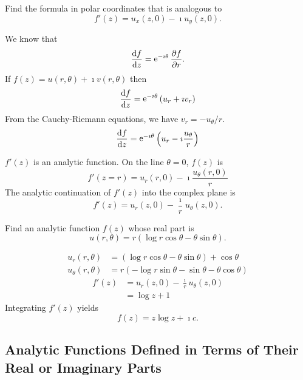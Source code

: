 \begin{Example}
  Find the formula in polar coordinates that is analogous to
  \[
  f'(z) = u_x(z, 0) - \imath u_y(z,0).
  \]

  We know that
  \[
  \frac{\mathrm{d} f}{\mathrm{d} z} = \mathop{\mathrm{e}}\nolimits^{-\imath \theta} \frac{\partial f}{\partial r}.
  \]
  If $f(z) = u(r,\theta) + \imath v(r,\theta)$ then
  \[
  \frac{\mathrm{d} f}{\mathrm{d} z} = \mathop{\mathrm{e}}\nolimits^{-\imath \theta} \left( u_r + \imath v_r \right)
  \]
  From the Cauchy-Riemann equations, we have $v_r = -u_\theta / r$.
  \[
  \frac{\mathrm{d} f}{\mathrm{d} z} = \mathop{\mathrm{e}}\nolimits^{-\imath \theta} \left( u_r - \imath \frac{ u_\theta}{r} \right)
  \]

  $f'(z)$ is an analytic function.  On the line $\theta = 0$, $f(z)$ is
  \[
  f'(z = r) = u_r(r,0) - \imath \frac{u_\theta(r,0)}{r}
  \]
  The analytic continuation of $f'(z)$ into the complex plane is
  \[
  \boxed{ 
    f'(z) = u_r(z, 0) - \frac{\imath}{r} u_\theta(z,0). 
    }
  \]
\end{Example}





\begin{Example}
  Find an analytic function $f(z)$ whose real part is
  \[
  u(r,\theta) =  r \left( \log r \cos \theta - \theta \sin \theta \right).
  \]

  \begin{align*}
    u_r(r, \theta) &= \left( \log r \cos \theta - \theta \sin \theta \right) + \cos \theta 
    \\
    u_\theta(r,\theta) &= r \left( -\log r \sin \theta - \sin \theta - \theta \cos \theta \right)
  \end{align*}
  \begin{align*}
    f'(z)
    &= u_r(z,0) - \frac{\imath}{r} u_\theta(z,0) 
    \\
    &= \log z + 1
  \end{align*}
  Integrating $f'(z)$ yields
  \[
  \boxed{ 
    f(z) = z \log z + \imath c. 
    }
  \]
\end{Example}






\subsection{Analytic Functions Defined in Terms of Their Real or Imaginary
  Parts}





